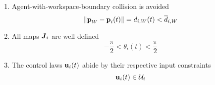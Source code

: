 \begin{bg_box}
\begin{problem}
\begin{enumerate}
    \item Agent-with-workspace-boundary collision is avoided
      $$ \|\bm{\mathbf{p}}_W - \bm{\mathbf{p}}_i(t)\| = d_{i,W} (t) < \overline{d}_{i,W}$$

    \item All maps $\bm{\mathit{J}}_i$ are well defined
      $$- \frac{\pi}{2} < \theta_i(t) < \frac{\pi}{2}$$

    \item The control laws $\bm{\mathbf{u}}_i(t)$ abide by their respective input constraints
      $$\bm{\mathbf{u}}_i(t) \in \mathcal{U}_i$$

  \end{enumerate}
\end{problem}
\end{bg_box}
